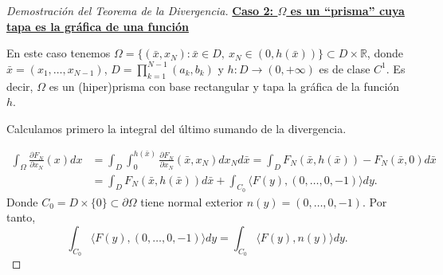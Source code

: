 \documentclass[12pt,spanish]{article}
\theoremstyle{definition}
\theoremstyle{remark}
\begin{document}
\begin{proof}[Demostración del Teorema de la Divergencia]
	\underline{\textbf{Caso 2: $\Omega$ es un ``prisma'' cuya tapa es la gráfica de una función}}
	
	En este caso tenemos $\Omega=\{(\bar{x},x_N):\bar{x}\in D, \ x_N\in (0,h(\bar{x}))\}\subset D\times\mathbb{R}$, donde $\bar{x}=(x_1,\ldots,x_{N-1})$, $\displaystyle{D=\prod_{k=1}^{N-1}(a_k,b_k)}$ y $h:D\rightarrow(0,+\infty)$ es de clase $C^1$.
	Es decir, $\Omega$ es un (hiper)prisma con base rectangular y tapa la gráfica de la función $h$.
	
	Calculamos primero la integral del último sumando de la divergencia.
	
	\begin{align*}
	\int_\Omega\frac{\partial F_N}{\partial x_N}(x)dx&= \int_D\int_0^{h(\bar{x})}\frac{\partial F_N}{\partial x_N}(\bar{x},x_N)d x_N d\bar{x} = \int_D  F_N(\bar{x},h(\bar{x}))-F_N(\bar{x},0) d\bar{x} \\ 
	&= \int_D  F_N(\bar{x},h(\bar{x}))d\bar{x}+\int_{C_0}\langle F(y),(0,\ldots,0,-1) \rangle dy.
	\end{align*}
	Donde $C_0=D\times \{0\}\subset\partial\Omega$ tiene normal exterior $n(y)=(0,\ldots,0,-1)$. Por tanto,
	\[\int_{C_0}\langle F(y),(0,\ldots,0,-1) \rangle dy=\int_{C_0}\langle F(y),n(y)\rangle dy.\]
	

\end{proof}
\end{document}
